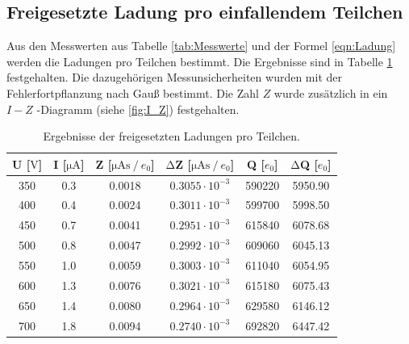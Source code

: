 \subsection{Freigesetzte Ladung pro einfallendem Teilchen}
\label{subsec:LadungProTeilchen}
Aus den Messwerten aus Tabelle \ref{tab:Messwerte} und der Formel \ref{eqn:Ladung} werden die Ladungen pro Teilchen bestimmt.
Die Ergebnisse sind in Tabelle \ref{tab:Ladungen} festgehalten.
Die dazugehörigen Messunsicherheiten wurden mit der Fehlerfortpflanzung nach Gauß bestimmt.
Die Zahl $Z$ wurde zusätzlich in ein $I-Z$ -Diagramm (siehe \ref{fig:I_Z}) festgehalten.

\begin{table}
  \label{tab:Ladungen}
  \centering
  \caption{Ergebnisse der freigesetzten Ladungen pro Teilchen.}
  \begin{tabular}{c c c c c c}
    \toprule
    {U [$\si{\volt}$]} & {I [$\si{\micro\ampere}$]} & {Z [$\si{\micro\ampere\second} \mathbin{/} e_0 $]} & {$\increment$Z [$\si{\micro\ampere\second} \mathbin{/} e_0 $]} & {Q [$e_0$]} & {$\increment$Q [$e_0$]}\\
    \midrule
    350 &0.3 & 0.0018 & $0.3055 \cdot 10^{-3}$ & 590220& 5950.90 \\
    400 &0.4 & 0.0024 & $0.3011 \cdot 10^{-3}$ & 599700& 5998.50 \\
    450 &0.7 & 0.0041 & $0.2951 \cdot 10^{-3}$ & 615840& 6078.68 \\
    500 &0.8 & 0.0047 & $0.2992 \cdot 10^{-3}$ & 609060& 6045.13 \\
    550 &1.0 & 0.0059 & $0.3003 \cdot 10^{-3}$ & 611040& 6054.95 \\
    600 &1.3 & 0.0076 & $0.3021 \cdot 10^{-3}$ & 615180& 6075.43 \\
    650 &1.4 & 0.0080 & $0.2964 \cdot 10^{-3}$ & 629580& 6146.12 \\
    700 &1.8 & 0.0094 & $0.2740 \cdot 10^{-3}$ & 692820& 6447.42 \\
  \end{tabular}
\end{table}

